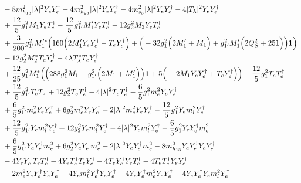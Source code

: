 {\begin{align}
 &-8 m_{h_{13}}^2 |\lambda|^2 {Y_e  Y_{e}^{\dagger}} -4 m_{h_{23}}^2 |\lambda|^2 {Y_e  Y_{e}^{\dagger}} -4 m_{s_3}^2 |\lambda|^2 {Y_e  Y_{e}^{\dagger}} -4 |T_{\lambda}|^2 {Y_e  Y_{e}^{\dagger}} \nonumber \\ 
 &+\frac{12}{5} g_{1}^{2} M_1 {Y_e  T_{e}^{\dagger}} -\frac{12}{5} g_{1'}^{2} M_1' {Y_e  T_{e}^{\dagger}} -12 g_{2}^{2} M_2 {Y_e  T_{e}^{\dagger}} \nonumber \\ 
 &+\frac{3}{200} g_{1'}^{2} M_1'^* \Big(160 \Big(2 M_1' {Y_e  Y_{e}^{\dagger}}  - {T_e  Y_{e}^{\dagger}} \Big) + \Big(-32 g_{1}^{2} \Big(2 M_1'  + M_1\Big) + g_{1'}^{2} M_1' \Big(2 Q_{S}^{2}  + 251\Big)\Big){\bf 1} \Big)\nonumber \\ 
 &-12 g_{2}^{2} M_2^* {T_e  Y_{e}^{\dagger}} -4 \lambda T_{\lambda}^* {T_e  Y_{e}^{\dagger}} \nonumber \\ 
 &+\frac{12}{25} g_{1}^{2} M_1^* \Big(\Big(288 g_{1}^{2} M_1  - g_{1'}^{2} \Big(2 M_1  + M_1'\Big)\Big){\bf 1}  + 5 \Big(-2 M_1 {Y_e  Y_{e}^{\dagger}}  + {T_e  Y_{e}^{\dagger}}\Big)\Big)-\frac{12}{5} g_{1}^{2} {T_e  T_{e}^{\dagger}} \nonumber \\ 
 &+\frac{12}{5} g_{1'}^{2} {T_e  T_{e}^{\dagger}} +12 g_{2}^{2} {T_e  T_{e}^{\dagger}} -4 |\lambda|^2 {T_e  T_{e}^{\dagger}} -\frac{6}{5} g_{1}^{2} {m_e^2  Y_e  Y_{e}^{\dagger}} \nonumber \\ 
 &+\frac{6}{5} g_{1'}^{2} {m_e^2  Y_e  Y_{e}^{\dagger}} +6 g_{2}^{2} {m_e^2  Y_e  Y_{e}^{\dagger}} -2 |\lambda|^2 {m_e^2  Y_e  Y_{e}^{\dagger}} -\frac{12}{5} g_{1}^{2} {Y_e  m_l^2  Y_{e}^{\dagger}} \nonumber \\ 
 &+\frac{12}{5} g_{1'}^{2} {Y_e  m_l^2  Y_{e}^{\dagger}} +12 g_{2}^{2} {Y_e  m_l^2  Y_{e}^{\dagger}} -4 |\lambda|^2 {Y_e  m_l^2  Y_{e}^{\dagger}} -\frac{6}{5} g_{1}^{2} {Y_e  Y_{e}^{\dagger}  m_e^2} \nonumber \\ 
 &+\frac{6}{5} g_{1'}^{2} {Y_e  Y_{e}^{\dagger}  m_e^2} +6 g_{2}^{2} {Y_e  Y_{e}^{\dagger}  m_e^2} -2 |\lambda|^2 {Y_e  Y_{e}^{\dagger}  m_e^2} -8 m_{h_{13}}^2 {Y_e  Y_{e}^{\dagger}  Y_e  Y_{e}^{\dagger}} \nonumber \\ 
 &-4 {Y_e  Y_{e}^{\dagger}  T_e  T_{e}^{\dagger}} -4 {Y_e  T_{e}^{\dagger}  T_e  Y_{e}^{\dagger}} -4 {T_e  Y_{e}^{\dagger}  Y_e  T_{e}^{\dagger}} -4 {T_e  T_{e}^{\dagger}  Y_e  Y_{e}^{\dagger}} \nonumber \\ 
 &-2 {m_e^2  Y_e  Y_{e}^{\dagger}  Y_e  Y_{e}^{\dagger}} -4 {Y_e  m_l^2  Y_{e}^{\dagger}  Y_e  Y_{e}^{\dagger}} -4 {Y_e  Y_{e}^{\dagger}  m_e^2  Y_e  Y_{e}^{\dagger}} -4 {Y_e  Y_{e}^{\dagger}  Y_e  m_l^2  Y_{e}^{\dagger}} \nonumber \\ 

\end{align}}
